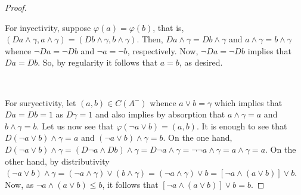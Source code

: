 \documentclass[10pt,a4paper]{amsart}
\begin{document}
\begin{proof}
\

For inyectivity, suppose  $\varphi(a) = \varphi(b)$, that is, $(Da \wedge \gamma, a \wedge \gamma) = (Db \wedge \gamma, b \wedge \gamma)$. 
Then, $Da \wedge \gamma = Db \wedge \gamma$ and $a \wedge \gamma = b \wedge \gamma$ whence  $\neg Da = \neg Db$ and $\neg a = \neg b$, respectively.
Now, $\neg Da = \neg Db$ implies that $Da = Db$. 
So, by regularity it follows that $a = b$, as desired.

\

For suryectivity, let $(a,b) \in C(A^-)$  whence $a \vee b = \gamma$ which implies that 
$Da = Db = 1$ as $D\gamma = 1$ and also implies by absorption that $a \wedge \gamma = a$ and $b \wedge \gamma = b$.
Let us now see that $\varphi (\neg a \vee b) = (a,b)$. 
It is enough to see that $D(\neg a \vee b) \wedge \gamma = a$ and $(\neg a \vee b) \wedge \gamma = b$.
On the one hand, $D(\neg a \vee b) \wedge \gamma = (D\neg a \wedge Db) \wedge \gamma = D\neg a \wedge \gamma = \neg \neg a \wedge \gamma = a \wedge \gamma = a$. 
On the other hand, by distributivity  $(\neg a \vee b) \wedge \gamma = (\neg a \wedge \gamma) \vee (b \wedge \gamma) = (\neg a \wedge \gamma) \vee b = [\neg a \wedge (a \vee b)] \vee b$. 
Now,  as $\neg a \wedge (a \vee b) \leq b$, it follows that  $[\neg a \wedge (a \vee b)] \vee b= b$.
\end{proof}
\end{document}

